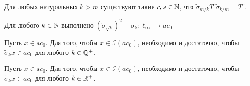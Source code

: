 {\begin{hypothesis}
	Для любых натуральных $k > m$ существуют такие $r, s\in\mathbb{N}$, что  $\tilde\sigma_{m/k} T^r \tilde\sigma_{k/m} = T^s$.
\end{hypothesis}


\begin{hypothesis}
	Для любого $k \in \mathbb{N}$ выполнено $(\tilde\sigma_{\sqrt{k}})^2 - \sigma_k : \ell_\infty \to ac_0$.
\end{hypothesis}



\begin{hypothesis}
	Пусть $x\in ac_0$.
	Для того, чтобы $x\in \mathcal{I}(ac_0)$, необходимо и достаточно,
	чтобы $\tilde\sigma_{k} x \in ac_0$ для любого $k\in \mathbb{Q}^+$.
\end{hypothesis}


\begin{hypothesis}
	Пусть $x\in ac_0$.
	Для того, чтобы $x\in \mathcal{I}(ac_0)$, необходимо и достаточно,
	чтобы $\tilde\sigma_{k} x \in ac_0$ для любого $k\in \mathbb{R}^+$.
\end{hypothesis}

}
